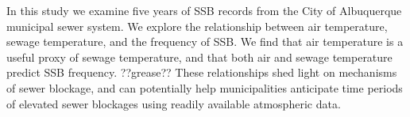 In this study we examine five years of SSB records from the City of Albuquerque
municipal sewer system.  We explore the relationship between air temperature,
sewage temperature, and the frequency of SSB.  We find that air temperature is
a useful proxy of sewage temperature, and that both air and sewage temperature
predict SSB frequency.  ??grease?? These relationships shed light on mechanisms
of sewer blockage, and can potentially help municipalities anticipate time
periods of elevated sewer blockages using readily available atmospheric data.
